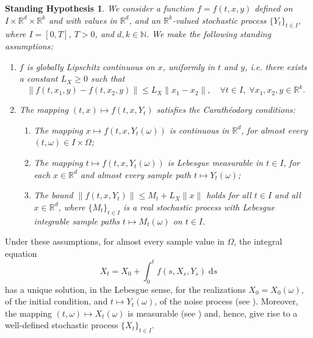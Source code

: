 \documentclass[reqno,12pt]{amsart}
\theoremstyle{plain} %
\newtheorem{stdhyp}{Standing Hypothesis}[section]
\theoremstyle{definition} %
\begin{document}
\begin{stdhyp}
    \label{standinghypotheses1}
    We consider a function $f=f(t, x, y)$ defined on $I\times \mathbb{R}^d\times\mathbb{R}^k$ and with values in $\mathbb{R}^d$, and an $\mathbb{R}^k$-valued stochastic process $\{Y_t\}_{t\in I}$, where $I=[0, T]$, $T > 0$, and $d, k\in \mathbb{N}.$ We make the following standing assumptions:
    \begin{enumerate}
        \item \label{standinghypotheses1Lx} $f$ is globally Lipschitz continuous on $x$, uniformly in $t$ and $y$, i.e. there exists a constant $L_X \geq 0$ such that
            \begin{equation}
                \label{Lxassumptionbasic}
                \|f(t, x_1, y) - f(t, x_2, y)\| \leq L_X \|x_1 - x_2\|, \quad \forall t \in I, \;\forall x_1, x_2, y\in\mathbb{R}^k.
            \end{equation}

        \item \label{standinghypotheses1Car} The mapping $(t, x) \mapsto f(t, x, Y_t)$ satisfies the Carath\'eodory conditions:
            \begin{enumerate}
                \item The mapping $x \mapsto f(t, x, Y_t(\omega))$ is continuous in $\mathbb{R}^d$, for almost every $(t, \omega)\in I\times \Omega$;
                \item The mapping $t \mapsto f(t, x, Y_t(\omega))$ is Lebesgue measurable in $t\in I$, for each $x\in \mathbb{R}^d$ and almost every sample path $t \mapsto Y_t(\omega)$;
                \item \label{standinghypotheses1Carboundonf} The bound $\|f(t, x, Y_t)\| \leq M_t + L_X\|x\|$ holds for all $t\in I$ and all $x\in\mathbb{R}^d$, where $\{M_t\}_{t\in I}$ is a real stochastic process with Lebesgue integrable sample paths $t\mapsto M_t(\omega)$ on $t\in I$.
            \end{enumerate}
    \end{enumerate}
\end{stdhyp}

Under these assumptions, for almost every sample value in $\Omega$, the integral equation
\begin{equation}
    \label{integralrodeform}
    X_t = X_0 + \int_0^t f(s, X_s, Y_s) \;\mathrm{d}s
\end{equation}
has a unique solution, in the Lebesgue sense, for the realizations $X_0 = X_0(\omega)$, of the initial condition, and $t\mapsto Y_t(\omega)$, of the noise process (see \cite[Theorem 1.1]{CoddingtonLevinson1985}). Moreover, the mapping $(t, \omega) \mapsto X_t(\omega)$ is measurable (see \cite[Section 2.1.2]{HanKloeden2017}) and, hence, give rise to a well-defined stochastic process $\{X_t\}_{t\in I}$.
\end{document}
